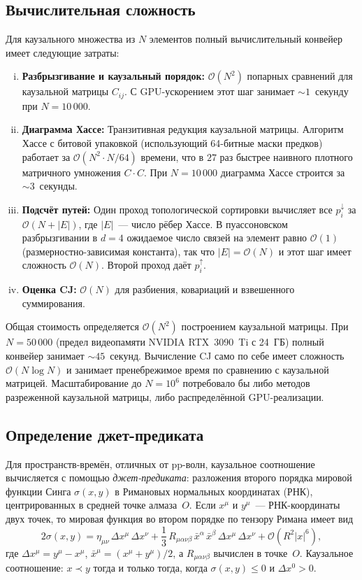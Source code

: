 \documentclass[12pt,a4paper]{article}
\theoremstyle{plain}
\theoremstyle{definition}
\theoremstyle{remark}
\newcommand{\order}{\mathcal{O}}
\begin{document}
\subsection{Вычислительная сложность}
\label{sec:complexity}

Для каузального множества из $N$ элементов полный
вычислительный конвейер имеет следующие затраты:
\begin{enumerate}[(i)]
\item \textbf{Разбрызгивание и каузальный порядок:}
  $\order(N^2)$ попарных сравнений для каузальной
  матрицы $C_{ij}$.  С GPU-ускорением этот шаг занимает
  $\sim 1$~секунду при $N = 10\,000$.
\item \textbf{Диаграмма Хассе:} Транзитивная редукция
  каузальной матрицы.  Алгоритм Хассе с битовой упаковкой
  (использующий 64-битные маски предков) работает за
  $\order(N^2 \cdot N/64)$ времени, что в $27$ раз быстрее
  наивного плотного матричного умножения $C \cdot C$.
  При $N = 10\,000$ диаграмма Хассе строится за
  $\sim 3$~секунды.
\item \textbf{Подсчёт путей:} Один проход топологической
  сортировки вычисляет все $p_i^{\downarrow}$ за
  $\order(N + |E|)$, где $|E|$~--- число рёбер Хассе.
  В пуассоновском разбрызгивании в $d = 4$ ожидаемое число
  связей на элемент равно $\order(1)$ (размерностно-зависимая
  константа), так что $|E| = \order(N)$ и этот шаг имеет
  сложность $\order(N)$.  Второй проход даёт
  $p_i^{\uparrow}$.
\item \textbf{Оценка CJ:} $\order(N)$ для разбиения,
  ковариаций и взвешенного суммирования.
\end{enumerate}
Общая стоимость определяется $\order(N^2)$ построением
каузальной матрицы.  При $N = 50\,000$ (предел видеопамяти
NVIDIA RTX~3090~Ti с 24~ГБ) полный конвейер занимает
$\sim 45$~секунд.  Вычисление CJ само по себе имеет
сложность $\order(N \log N)$ и занимает пренебрежимое время
по сравнению с каузальной матрицей.  Масштабирование до
$N = 10^6$ потребовало бы либо методов разреженной каузальной
матрицы, либо распределённой GPU-реализации.

\subsection{Определение джет-предиката}
\label{sec:jet-def}

Для пространств-времён, отличных от pp-волн, каузальное
соотношение вычисляется с помощью \emph{джет-предиката}:
разложения второго порядка мировой функции
Синга $\sigma(x, y)$ в Римановых нормальных координатах
(РНК), центрированных в средней точке алмаза~$O$.  Если
$x^\mu$ и $y^\mu$~--- РНК-координаты двух точек, то мировая
функция во втором порядке по тензору Римана имеет вид
\begin{equation}\label{eq:jet}
  2\sigma(x, y) = \eta_{\mu\nu}\, \Delta x^\mu\, \Delta x^\nu
  + \frac{1}{3}\, R_{\mu\alpha\nu\beta}\,
    \bar{x}^\alpha\, \bar{x}^\beta\, \Delta x^\mu\, \Delta x^\nu
  + \order(R^2 |x|^6),
\end{equation}
где $\Delta x^\mu = y^\mu - x^\mu$,
$\bar{x}^\mu = (x^\mu + y^\mu)/2$, а $R_{\mu\alpha\nu\beta}$
вычислен в точке~$O$.  Каузальное соотношение: $x \prec y$
тогда и только тогда, когда $\sigma(x, y) \leq 0$ и
$\Delta x^0 > 0$.
\end{document}
